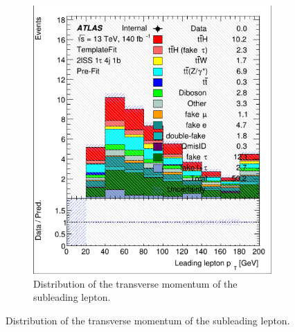 \begin{figure}[htb!]
\begin{subfigure}{0.45\textwidth}
        \includegraphics[width=\linewidth]{figures/plots/histograms/lep_pt_1.png}
        \caption{Distribution of the transverse momentum of the subleading lepton.}
        \label{fig:lep_pt_1}
    \end{subfigure}

    \vspace{0.5cm}


\end{figure}
